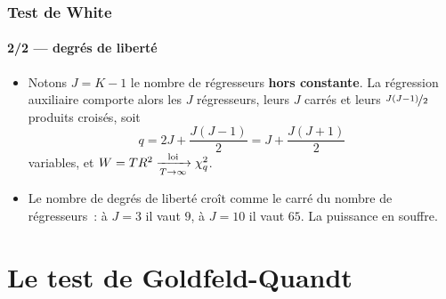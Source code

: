\documentclass[10pt]{beamer}
\begin{document}
\begin{frame}
  \frametitle{Test de White}
  \framesubtitle{2/2 --- degrés de liberté}

  \begin{itemize}

  \item Notons $J = K-1$ le nombre de régresseurs \textbf{hors constante}. La
    régression auxiliaire comporte alors les $J$ régresseurs, leurs $J$ carrés
    et leurs $\nicefrac{J(J-1)}{2}$ produits croisés, soit
    \[
      q = 2J + \frac{J(J-1)}{2} = J + \frac{J(J+1)}{2}
    \]
    variables, et $W = TR^2 \xrightarrow[T\rightarrow\infty]{\text{loi}} \chi^2_q$.\newline

  \item Le nombre de degrés de liberté croît comme le carré du nombre de
    régresseurs~: à $J=3$ il vaut $9$, à $J=10$ il vaut $65$. La puissance en
    souffre.\newline

  \end{itemize}


\end{frame}


\section{Le test de Goldfeld-Quandt}
\end{document}
